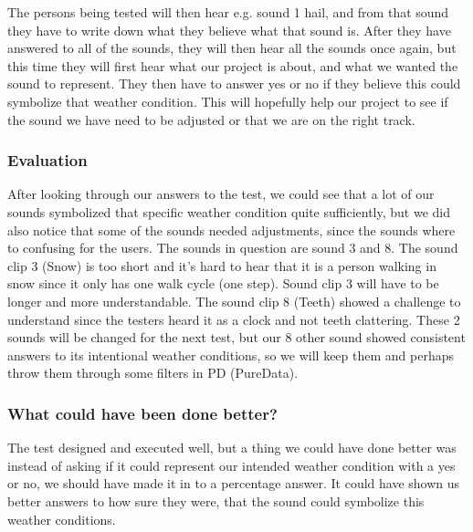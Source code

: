 The persons being tested will then hear e.g. sound 1 hail, and from that sound they have to write down what they believe what that sound is. 
After they have answered to all of the sounds, they will then hear all the sounds once again, but this time they will first hear what our project is about, and what we wanted the sound to represent. 
They then have to answer yes or no if they believe this could symbolize that weather condition. 
This will hopefully help our project to see if the sound we have need to be adjusted or that we are on the right track.


\subsubsection*{Evaluation} %
\label{ssub:test_2_evaluation}

After looking through our answers to the test, we could see that a lot of our sounds symbolized that specific weather condition quite sufficiently, but we did also notice that some of the sounds needed adjustments, since the sounds where to confusing for the users. 
The sounds in question are sound 3 and 8. 
The sound clip 3 (Snow) is too short and it’s hard to hear that it is a person walking in snow since it only has one walk cycle (one step). 
Sound clip 3 will have to be longer and more understandable. 
The sound clip 8 (Teeth) showed a challenge to understand since the testers heard it as a clock and not teeth clattering.
These 2 sounds will be changed for the next test, but our 8 other sound showed consistent answers to its intentional weather conditions, so we will keep them and perhaps throw them through some filters in PD (PureData).


\subsubsection*{What could have been done better?} %
\label{ssub:test_2_what_could_have_been_done_better_}

The test designed and executed well, but a thing we could have done better was instead of asking if it could represent our intended weather condition with a yes or no, we should have made it in to a percentage answer. 
It could have shown us better answers to how sure they were, that the sound could symbolize this weather conditions.

